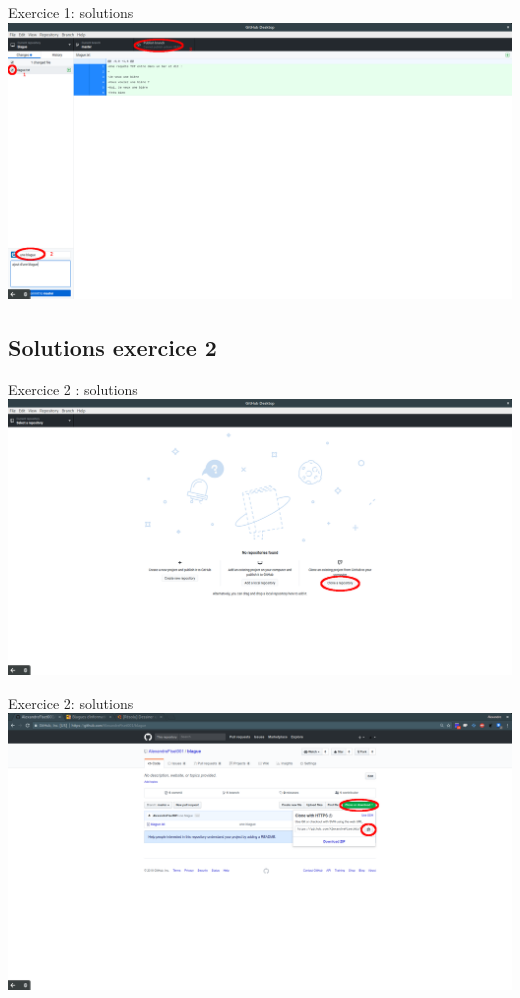 \documentclass{beamer}
\begin{document}
\begin{frame}{Exercice 1: solutions}
    \centering
    \includegraphics[width=\textwidth]{img/image_exercices/add+commit+push_1.png}
\end{frame}

\subsection{Solutions exercice 2}

\begin{frame}{Exercice 2 : solutions}
    \centering
    \includegraphics[width=\textwidth]{img/image_exercices/clonning_repo.png}
\end{frame}

\begin{frame}{Exercice 2: solutions}
	\centering
    \includegraphics[width=\textwidth]{img/image_exercices/get_url_all_time.png}
\end{frame}
\end{document}
